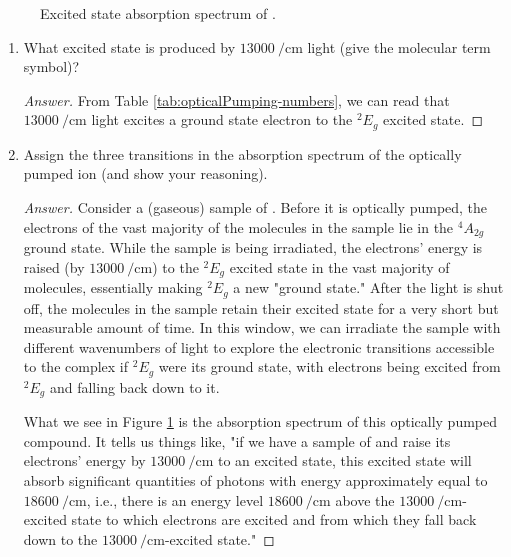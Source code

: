 \documentclass[../psets.tex]{subfiles}
\begin{document}
\begin{enumerate}[label={\Roman*)}]
\begin{figure}[h!]
        \caption{Excited state absorption spectrum of .}
        \label{fig:opticalPumping-spectrum}
    \end{figure}
    \begin{enumerate}
        \item What excited state is produced by $\SI{13000}{\per\centi\meter}$ light (give the molecular term symbol)?
        \begin{proof}[Answer]
            From Table \ref{tab:opticalPumping-numbers}, we can read that $\SI{13000}{\per\centi\meter}$ light excites a ground state electron to the ${}^2E_g$ excited state.
        \end{proof}
        \item Assign the three transitions in the absorption spectrum of the optically pumped ion (and show your reasoning).
        \begin{proof}[Answer]
            Consider a (gaseous) sample of . Before it is optically pumped, the electrons of the vast majority of the molecules in the sample lie in the ${}^4A_{2g}$ ground state. While the sample is being irradiated, the electrons' energy is raised (by $\SI{13000}{\per\centi\meter}$) to the ${}^2E_g$ excited state in the vast majority of molecules, essentially making ${}^2E_g$ a new "ground state." After the light is shut off, the molecules in the sample retain their excited state for a very short but measurable amount of time. In this window, we can irradiate the sample with different wavenumbers of light to explore the electronic transitions accessible to the complex if ${}^2E_g$ were its ground state, with electrons being excited from ${}^2E_g$ and falling back down to it.\par
            What we see in Figure \ref{fig:opticalPumping-spectrum} is the absorption spectrum of this optically pumped compound. It tells us things like, "if we have a sample of  and raise its electrons' energy by $\SI{13000}{\per\centi\meter}$ to an excited state, this excited state will absorb significant quantities of photons with energy approximately equal to $\SI{18600}{\per\centi\meter}$, i.e., there is an energy level $\SI{18600}{\per\centi\meter}$ above the $\SI{13000}{\per\centi\meter}$-excited state to which electrons are excited and from which they fall back down to the $\SI{13000}{\per\centi\meter}$-excited state."\par

\end{proof}
\end{enumerate}
\end{enumerate}
\end{document}
